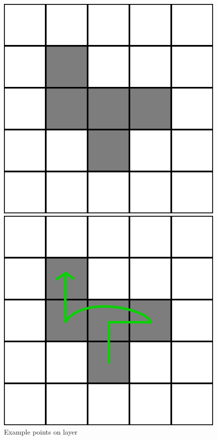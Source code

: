 \documentclass[titlepage]{article}
\newcommand{\multifigcaption}{\captionsetup{justification=justified}}
\begin{document}
\begin{figure}[H]
	\begin{center}
		\begin{minipage}{.45\linewidth}
			\includegraphics[width=\textwidth]{img/greedy/example-points-on-layer.png}
			\multifigcaption
			\caption{Example points on layer \newline}
			\label{img:greedy/example-points-on-layer}
		\end{minipage}
		\hspace{.05\linewidth}
		\begin{minipage}{.45\linewidth}
			\includegraphics[width=\textwidth]{img/greedy/example-path-sol-1}

\end{minipage}
\end{center}
\end{figure}
\end{document}
